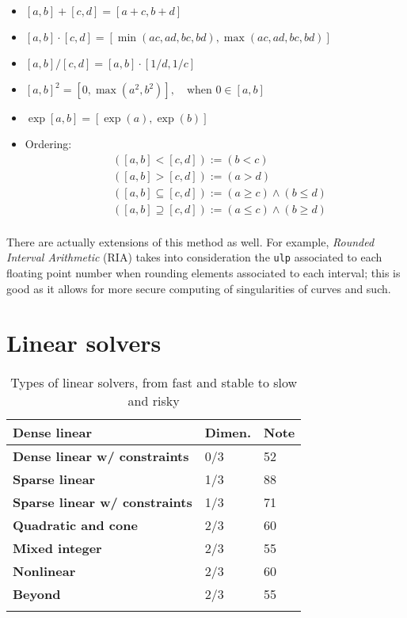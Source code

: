 \begin{tcolorbox}[colback=white, colframe=red!10!black, title=\textbf{Interval Arithmetic I : Identities} ]

\begin{itemize}
    \item  $[a,b]+[c,d] = [a+c,b+d]$
    \item  $[a,b]\cdot[c,d] = [\min(ac,ad,bc,bd), \max(ac,ad,bc,bd)]$
    \item  $[a,b]/[c,d] = [a,b]\cdot[1/d, 1/c]$
    \item  $[a,b]^2 = [0, \max(a^2,b^2)], \quad \text{when } 0 \in [a,b]$
    \item  $\exp[a,b] = [\exp(a), \exp(b)]$
    \item Ordering: 
    \begin{align*}
&([a, b]<[c, d]):=(b<c) \\
&([a, b]>[c, d]):=(a>d)\\
&([a, b] \subseteq[c, d]):=(a \geq c) \wedge(b \leq d)\\
&([a, b] \supseteq[c, d]):=(a \leq c) \wedge(b \geq d)  \\
\end{align*}
\end{itemize}

\end{tcolorbox}

There are actually extensions of this method as well. For example,
\emph{Rounded Interval Arithmetic} (RIA) \cite{inter5, inter6}
takes into consideration the \texttt{ulp} associated to each floating
point number when rounding elements associated to each interval; this is good
as it allows for more secure computing of singularities of curves and such.

\section{Linear solvers}



\begin{table*}[h] \centering
\begin{small}
\begin{tabular}{@{}lll@{}}\toprule
\textbf{Dense linear} & \textbf{Dimen.} & \textbf{Note} \\ \midrule
\textbf{Dense linear w/ constraints} & 0/3 & 52  \\ \hdashline
\textbf{Sparse linear} & 1/3 & 88  \\ \hdashline
\textbf{Sparse linear w/ constraints} & 1/3 & 71  \\ \hdashline
\textbf{Quadratic and cone} & 2/3 & 60  \\ \hdashline
\textbf{Mixed integer} & 2/3 & 55\\ \hdashline
\textbf{Nonlinear} & 2/3 & 60  \\ \hdashline
\textbf{Beyond} & 2/3 & 55\\ \hdashline
\bottomrule
\end{tabular}
\end{small}
\caption{Types of linear solvers, from fast and stable to
slow and risky}
\end{table*}

